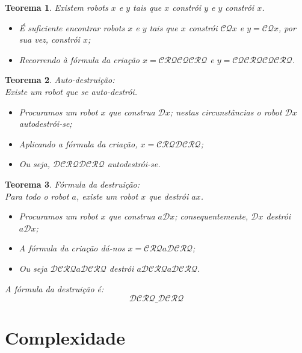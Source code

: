 \documentclass[10pt,a4paper]{report}
\newtheorem{theorem}{Teorema}
\begin{document}
\begin{theorem}
Existem robots $x$ e $y$ tais que $x$ constrói $y$ e $y$ constrói $x$.
\begin{itemize}
\item É suficiente encontrar robots $x$ e $y$ tais que $x$ constrói $\mathcal{CQ}x$ e $y = \mathcal{CQ}x$, por sua vez, constrói $x$;
\item Recorrendo à fórmula da criação $x = \mathcal{CRQCQCRQ}$ e $y = \mathcal{CQCRQCQCRQ}$.
\end{itemize}
\end{theorem}
\begin{theorem} Auto-destruição:\\
Existe um robot que se auto-destrói.

\begin{itemize}
\item Procuramos um robot $x$ que construa $\mathcal{D}x$; nestas circunstâncias o robot $\mathcal{D}x$ autodestrói-se;
\item Aplicando a fórmula da criação, $x = \mathcal{CRQDCRQ}$;
\item Ou seja, $\mathcal{DCRQDCRQ}$ autodestrói-se.
\end{itemize}
\end{theorem}
\begin{theorem} Fórmula da destruição:\\
Para todo o robot $a$, existe um robot $x$ que destrói $ax$.
\begin{itemize}
\item Procuramos um robot $x$ que construa $a\mathcal{D}x$; consequentemente, $\mathcal{D}x$ destrói $a\mathcal{D}x$;
\item A fórmula da criação dá-nos $x = \mathcal{CRQ}a\mathcal{DCRQ}$;
\item Ou seja $\mathcal{DCRQ}a\mathcal{DCRQ}$ destrói $a\mathcal{DCRQ}a\mathcal{DCRQ}$.
\end{itemize}
A fórmula da destruição é:
$$
\mathcal{DCRQ}\_\mathcal{DCRQ}
$$
\end{theorem}

\chapter{Complexidade}
\end{document}
